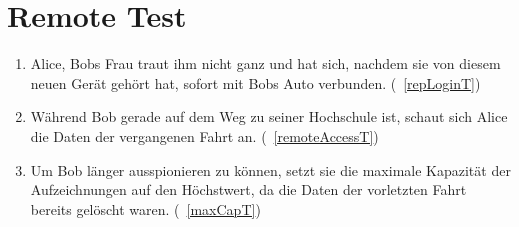 \documentclass[pflichtenheft.tex]{subfiles}
\begin{document}
\section{Remote Test}
\begin{enumerate}
  \item 
  Alice, Bobs Frau traut ihm nicht ganz und hat sich, nachdem sie von diesem neuen Gerät gehört hat, sofort mit Bobs Auto verbunden. (~\ref{repLoginT})
  \item  Während Bob gerade auf dem Weg zu seiner Hochschule ist, schaut sich Alice die Daten der vergangenen Fahrt an. (~\ref{remoteAccessT})
  \item Um Bob länger ausspionieren zu können, setzt sie die maximale Kapazität der Aufzeichnungen auf den Höchstwert, da die Daten der vorletzten Fahrt bereits gelöscht waren. (~\ref{maxCapT})
\end{enumerate}
\end{document}
